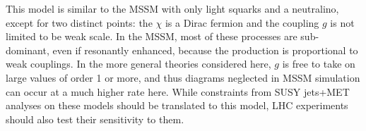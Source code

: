 
This model is similar to the MSSM with only light squarks and
a neutralino, except for two distinct points:  the $\chi$ is
a Dirac fermion and the coupling $g$ is not limited to be
weak scale.
In the MSSM, most of these processes are sub-dominant, even
if resonantly enhanced, because the production is proportional
to weak couplings.
In the more general theories
considered here, $g$ is free to take on large values of order 1 or
more, and thus diagrams neglected in MSSM simulation can occur at a
much higher rate here. While constraints from SUSY jets+MET analyses
on these models should be translated to this model, LHC experiments
should also test their sensitivity to them.

